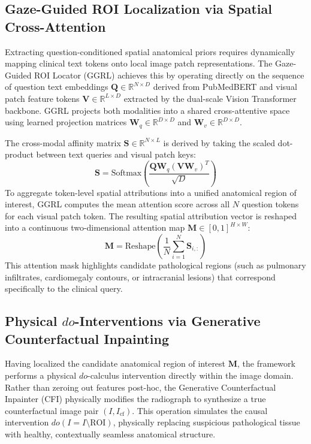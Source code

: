 \documentclass[journal]{IEEEtran}
\begin{document}
\subsection{Gaze-Guided ROI Localization via Spatial Cross-Attention}
Extracting question-conditioned spatial anatomical priors requires dynamically mapping clinical text tokens onto local image patch representations. The Gaze-Guided ROI Locator (GGRL) achieves this by operating directly on the sequence of question text embeddings $\mathbf{Q} \in \mathbb{R}^{N \times D}$ derived from PubMedBERT and visual patch feature tokens $\mathbf{V} \in \mathbb{R}^{L \times D}$ extracted by the dual-scale Vision Transformer backbone. GGRL projects both modalities into a shared cross-attentive space using learned projection matrices $\mathbf{W}_q \in \mathbb{R}^{D \times D}$ and $\mathbf{W}_v \in \mathbb{R}^{D \times D}$.

The cross-modal affinity matrix $\mathbf{S} \in \mathbb{R}^{N \times L}$ is derived by taking the scaled dot-product between text queries and visual patch keys:
\begin{equation}
\mathbf{S} = \text{Softmax}\left(\frac{\mathbf{Q} \mathbf{W}_q (\mathbf{V} \mathbf{W}_v)^T}{\sqrt{D}}\right)
\end{equation}
To aggregate token-level spatial attributions into a unified anatomical region of interest, GGRL computes the mean attention score across all $N$ question tokens for each visual patch token. The resulting spatial attribution vector is reshaped into a continuous two-dimensional attention map $\mathbf{M} \in [0, 1]^{H \times W}$:
\begin{equation}
\mathbf{M} = \text{Reshape}\left(\frac{1}{N} \sum_{i=1}^N \mathbf{S}_{i, :}\right)
\end{equation}
This attention mask highlights candidate pathological regions (such as pulmonary infiltrates, cardiomegaly contours, or intracranial lesions) that correspond specifically to the clinical query.

\subsection{Physical $do$-Interventions via Generative Counterfactual Inpainting}
Having localized the candidate anatomical region of interest $\mathbf{M}$, the framework performs a physical $do$-calculus intervention directly within the image domain. Rather than zeroing out features post-hoc, the Generative Counterfactual Inpainter (CFI) physically modifies the radiograph to synthesize a true counterfactual image pair $(I, I_{\text{cf}})$. This operation simulates the causal intervention $do(I = I \setminus \text{ROI})$, physically replacing suspicious pathological tissue with healthy, contextually seamless anatomical structure.
\end{document}
